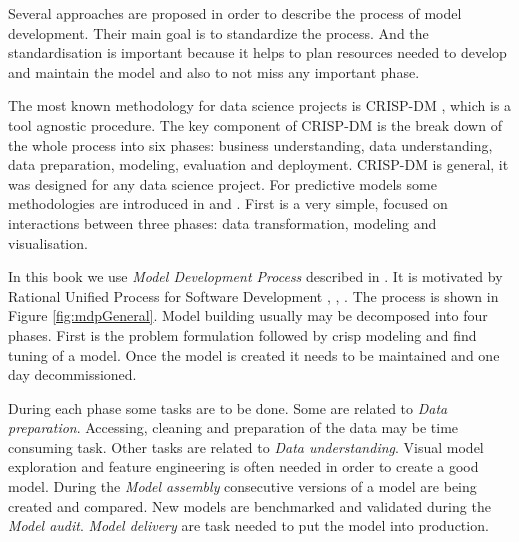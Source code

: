 \documentclass[12pt,]{krantz}
\begin{document}
Several approaches are proposed in order to describe the process of model development. Their main goal is to standardize the process. And the standardisation is important because it helps to plan resources needed to develop and maintain the model and also to not miss any important phase.

The most known methodology for data science projects is CRISP-DM \citep{crisp1999}, \citep{crisp2019wiki} which is a tool agnostic procedure. The key component of CRISP-DM is the break down of the whole process into six phases: business understanding, data understanding, data preparation, modeling, evaluation and deployment. CRISP-DM is general, it was designed for any data science project. For predictive models some methodologies are introduced in \citep{r4ds2019} and \citep{misconceptions2019}. First is a very simple, focused on interactions between three phases: data transformation, modeling and visualisation.

In this book we use \emph{Model Development Process} described in \citep{mdp2019}. It is motivated by Rational Unified Process for Software Development \citep{rup1998}, \citep{usdp1999}, \citep{spiral1988}. The process is shown in Figure \ref{fig:mdpGeneral}. Model building usually may be decomposed into four phases. First is the problem formulation followed by crisp modeling and find tuning of a model. Once the model is created it needs to be maintained and one day decommissioned.

During each phase some tasks are to be done. Some are related to \emph{Data preparation}. Accessing, cleaning and preparation of the data may be time consuming task. Other tasks are related to \emph{Data understanding}. Visual model exploration and feature engineering is often needed in order to create a good model. During the \emph{Model assembly} consecutive versions of a model are being created and compared. New models are benchmarked and validated during the \emph{Model audit}. \emph{Model delivery} are task needed to put the model into production.
\end{document}
